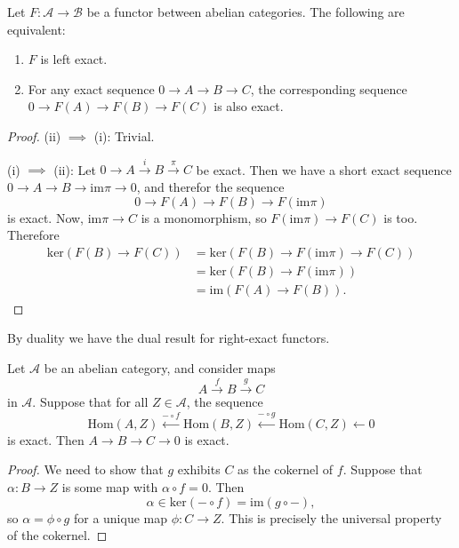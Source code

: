 \begin{lemma}
   Let $ F: \mathcal{A} \to \mathcal{B} $ be a functor between abelian categories. The following are equivalent:
   \begin{enumerate}[label=(\roman*)]
      \item $ F $ is left exact.
      \item For any exact sequence $ 0 \to A \to B \to C $, the corresponding sequence $ 0\to F(A) \to F(B) \to F(C) $ is also exact.
   \end{enumerate}
\end{lemma}
\begin{proof}
   (ii) $ \implies $ (i): Trivial.

   (i) $ \implies $ (ii): Let $ 0\to A \xrightarrow{i} B \xrightarrow{\pi} C $ be exact. Then we have a short exact sequence $ 0 \to A \to B \to \text{im}\pi \to 0 $, and therefor the sequence
   \begin{equation*}
      0 \to F(A) \to F(B) \to F(\text{im}\pi)
   \end{equation*}
   is exact. Now, $ \text{im}\pi \to C $ is a monomorphism, so $ F(\text{im}\pi) \to F(C) $ is too. Therefore
   \begin{align*}
      \text{ker}(F(B) \to F(C)) &= \text{ker}(F(B) \to F(\text{im}\pi) \to F(C)) \\
                                &= \text{ker}(F(B) \to F(\text{im}\pi)) \\
                                &= \text{im}(F(A) \to F(B)).
   \end{align*}
\end{proof}

By duality we have the dual result for right-exact functors.

\begin{lemma}
   Let $ \mathcal{A} $ be an abelian category, and consider maps
   \begin{equation*}
      A \xrightarrow{f} B \xrightarrow{g} C
   \end{equation*}
   in $ \mathcal{A} $. Suppose that for all $ Z \in \mathcal{A} $, the sequence
   \begin{equation*}
      \text{Hom}(A, Z) \xleftarrow{-\circ f} \text{Hom}(B, Z) \xleftarrow{- \circ g} \text{Hom}(C, Z) \gets 0
   \end{equation*}
   is exact. Then $ A \to B \to C \to 0 $ is exact.
\end{lemma}
\begin{proof}
    We need to show that $ g $ exhibits $ C $ as the cokernel of $ f $. Suppose that $ \alpha: B \to Z $ is some map with $ \alpha \circ f = 0 $. Then
    \begin{equation*}
       \alpha \in \text{ker}(- \circ f) = \text{im}(g \circ -),
    \end{equation*}
    so $ \alpha = \phi \circ g $ for a unique map $ \phi: C \to Z $. This is precisely the universal property of the cokernel.
\end{proof}

